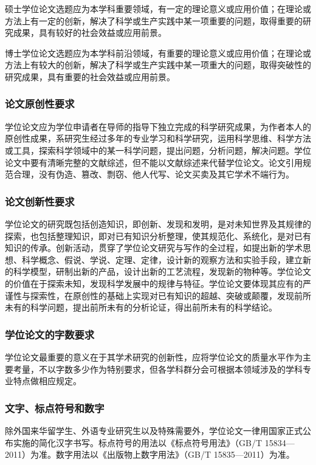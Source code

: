 硕士学位论文选题应为本学科重要领域，有一定的理论意义或应用价值；在理论或方法上有一定的创新，解决了科学或生产实践中某一项重要的问题，取得重要的研究成果，具有较好的社会效益或应用前景。

博士学位论文选题应为本学科前沿领域，有重要的理论意义或应用价值；在理论或方法上有较大的创新，解决了科学或生产实践中某一项重大的问题，取得突破性的研究成果，具有重要的社会效益或应用前景。

\subsubsection{论文原创性要求}

学位论文应为学位申请者在导师的指导下独立完成的科学研究成果，为作者本人的原创性成果，系研究生经过多年的专业学习和科学研究，运用科学思维、科学方法或工具，探索科学领域中的某一科学问题，提出问题，分析问题，解决问题。学位论文中要有清晰完整的文献综述，但不能以文献综述来代替学位论文。论文引用规范合理，没有伪造、篡改、剽窃、他人代写、论文买卖及其它学术不端行为。

\subsubsection{论文创新性要求}

学位论文的研究既包括创造知识，即创新、发现和发明，是对未知世界及其规律的探索，也包括整理知识，即对已有知识分析整理，使其规范化、系统化，是对已有知识的传承。创新活动，贯穿了学位论文研究与写作的全过程，如提出新的学术思想、科学概念、假说、学说、定理、定律，设计新的观察方法和实验手段，建立新的科学模型，研制出新的产品，设计出新的工艺流程，发现新的物种等。学位论文的价值在于探索未知，发现科学发展中的规律与特征。学位论文要体现其应有的严谨性与探索性，在原创性的基础上实现对已有知识的超越、突破或颠覆，发现前所未有的科学问题，提出前所未有的分析论证，得出前所未有的科学结论。

\subsubsection{学位论文的字数要求}
学位论文最重要的意义在于其学术研究的创新性，应将学位论文的质量水平作为主要考量，不以字数多少作为特别要求，但各学科群分会可根据本领域涉及的学科专业特点做相应规定。

\subsubsection{文字、标点符号和数字}

除外国来华留学生、外语专业研究生以及特殊需要外，学位论文一律用国家正式公布实施的简化汉字书写。标点符号的用法以《标点符号用法》（GB/T 15834—2011）为准。数字用法以《出版物上数字用法》（GB/T 15835—2011）为准。

